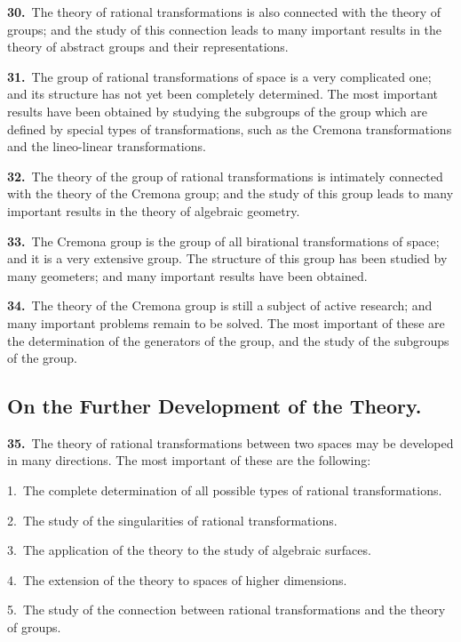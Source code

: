 \documentclass[11pt,a4paper]{article}
\begin{document}
\textbf{30.}\ The theory of rational transformations is also connected with the theory of groups; and the study of this connection leads to many important results in the theory of abstract groups and their representations.

\newpage
\setcounter{page}{198}

\noindent\textbf{31.}\ The group of rational transformations of space is a very complicated one; and its structure has not yet been completely determined. The most important results have been obtained by studying the subgroups of the group which are defined by special types of transformations, such as the Cremona transformations and the lineo-linear transformations.

\textbf{32.}\ The theory of the group of rational transformations is intimately connected with the theory of the Cremona group; and the study of this group leads to many important results in the theory of algebraic geometry.

\textbf{33.}\ The Cremona group is the group of all birational transformations of space; and it is a very extensive group. The structure of this group has been studied by many geometers; and many important results have been obtained.

\textbf{34.}\ The theory of the Cremona group is still a subject of active research; and many important problems remain to be solved. The most important of these are the determination of the generators of the group, and the study of the subgroups of the group.

\subsection*{On the Further Development of the Theory.}

\textbf{35.}\ The theory of rational transformations between two spaces may be developed in many directions. The most important of these are the following:

1.\ The complete determination of all possible types of rational transformations.

2.\ The study of the singularities of rational transformations.

3.\ The application of the theory to the study of algebraic surfaces.

4.\ The extension of the theory to spaces of higher dimensions.

5.\ The study of the connection between rational transformations and the theory of groups.
\end{document}
